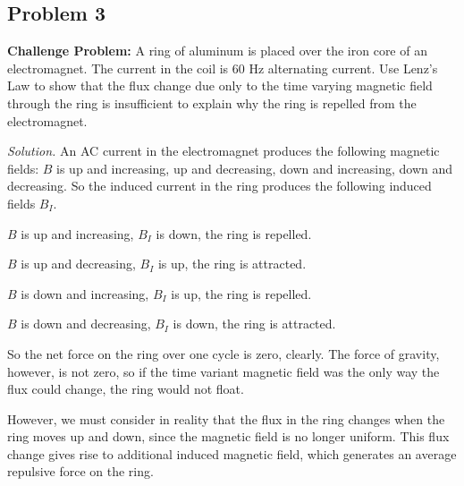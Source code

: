 \documentclass{article}
\begin{document}
	\subsection{Problem 3}
	\textbf{Challenge Problem:} A ring of aluminum is placed over the iron core of an electromagnet. The current in the coil is 60 Hz alternating current. Use Lenz's Law to show that the flux change due only to the time varying magnetic field through the ring is insufficient to explain why the ring is repelled from the electromagnet.
	
	\textit{Solution.}
	An AC current in the electromagnet produces the following magnetic fields: $B$ is up and increasing, up and decreasing, down and increasing, down and decreasing. So the induced current in the ring produces the following induced fields $B_I$.
	
	$B$ is up and increasing, $B_I$ is down, the ring is repelled.
	
	$B$ is up and decreasing, $B_I$ is up, the ring is attracted.
	
	$B$ is down and increasing, $B_I$ is up, the ring is repelled.
	
	$B$ is down and decreasing, $B_I$ is down, the ring is attracted.
	
	So the net force on the ring over one cycle is zero, clearly. The force of gravity, however, is not zero, so if the time variant magnetic field was the only way the flux could change, the ring would not float.
	
	However, we must consider in reality that the flux in the ring changes when the ring moves up and down, since the magnetic field is no longer uniform. This flux change gives rise to additional induced magnetic field, which generates an average repulsive force on the ring.
	
	
	
	
	
	
	
	
	
	
	
\end{document}
